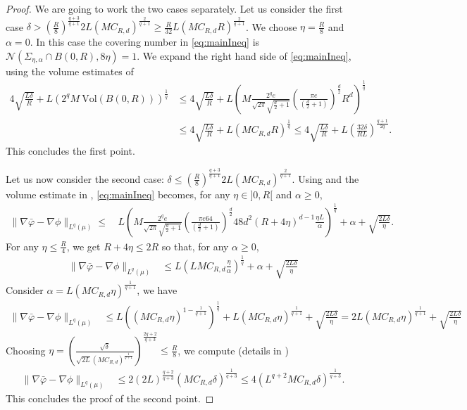 \documentclass[11pt]{article}
\newcommand{\1}{\mathbbm{1}}
\numberwithin{equation}{section}
\begin{document}
\begin{proof}
	We are going to work the two cases separately. Let us consider the first case $\delta > \left(\frac{R}{8}\right)^{\frac{q+3}{q+1}} 2L (MC_{R,d})^{\frac{2}{q+1}} \geq \frac{R}{32} L (MC_{R,d}R)^{\frac{2}{q+1}}  $. We choose $\eta = \frac{R}{8}$ and $\alpha = 0$. In this case the covering number in \eqref{eq:mainIneq} is $\mathcal{N}(\Sigma_{\eta,\alpha} \cap B(0,R), 8 \eta) = 1$. We expand the right hand side of \eqref{eq:mainIneq}, using the volume estimates of  
	\begin{align*}
		4 \sqrt{\frac{L\delta}{R}} + L \left( 2^qM \ \mathrm{Vol}(B(0,R))\right)^{\frac{1}{q}} &\leq 4 \sqrt{\frac{L\delta}{R}} + L \left(M  \frac{2^qe}{\sqrt{2\pi} \sqrt{\frac{d}{2} + 1}}
	\left(\frac{\pi e}{\left( \frac{d}{2} + 1 \right)} \right)^{\frac{d}{2}} R^d\right)^{\frac{1}{q}}\\
		&\leq 4 \sqrt{\frac{L\delta}{R}} + L(M C_{R,d}R)^{\frac{1}{q}} \leq 4 \sqrt{\frac{L\delta}{R}} + L\left(\frac{32 \delta}{RL} \right)^{\frac{q+1}{2q}}.
	\end{align*}
	This concludes the first point.

	Let us now consider the second case: $\delta \leq \left(\frac{R}{8}\right)^{\frac{q+3}{q+1}} 2L (MC_{R,d})^{\frac{2}{q+1}}$. Using  and the volume estimate in ,  \eqref{eq:mainIneq}  becomes, for any $\eta \in ]0,R[$ and $\alpha \geq 0$,
	\begin{align*}
		\| \nabla \bar{\varphi} - \nabla \phi\|_{L^q(\mu)} 
		\leq\,& L \left(M
		\frac{2^qe}{\sqrt{2\pi}\sqrt{\frac{d}{2} + 1} }
		\left(\frac{\pi e 64}{\left( \frac{d}{2} + 1 \right)} \right)^{\frac{d}{2}}  48d^2 (R+4\eta)^{d-1} \frac{\eta L}{\alpha}  \right)^{\frac{1}{q}}
		+ \alpha + \sqrt{\frac{2L \delta}{\eta}}.
	\end{align*}
	For any $\eta \leq \frac{R}{4}$, we get $R + 4 \eta  \leq 2R$ so that, for any $\alpha \geq 0$,
	\begin{align*}
		\| \nabla \bar{\varphi} - \nabla \phi\|_{L^q(\mu)} &\leq  L\left(LM C_{R,d}\frac{\eta}{\alpha}\right)^{\frac{1}{q}}  + \alpha  + \sqrt{\frac{2L \delta}{\eta}}
	\end{align*}
	Consider $\alpha = L \left( M C_{R,d} \eta \right)^{\frac{1}{q+1}} $, we have
	\begin{align*}
		\| \nabla \bar{\varphi} - \nabla \phi\|_{L^q(\mu)}  &\leq  L\left((M C_{R,d}\eta)^{1 - \frac{1}{q+1}}\right)^{\frac{1}{q}}  + L \left( M C_{R,d} \eta \right)^{\frac{1}{q+1}}  + \sqrt{\frac{2L \delta}{\eta}} =  2 L( M C_{R,d}\eta)^{\frac{1}{q+1}} + \sqrt{\frac{2L\delta}{\eta}}
	\end{align*}
	Choosing $\eta = \left(\frac{\sqrt{\delta}}{\sqrt{2L} (M C_{R,d})^{\frac{1}{q+1}}}\right)^{\frac{2q + 2}{q+3}} \leq \frac{R}{8}$, we compute (details in )
	\begin{align*}
		\| \nabla \bar{\varphi} - \nabla \phi\|_{L^q(\mu)}  &\leq 2 (2L)^{\frac{q+2}{q+3}} (MC_{R,d} \delta)^{\frac{1}{q+3}} \leq  4\left(L^{q+2}MC_{R,d} \delta\right)^{\frac{1}{q+3}}. 
	\end{align*}
	This concludes the proof of the second point.
\end{proof}
\end{document}
